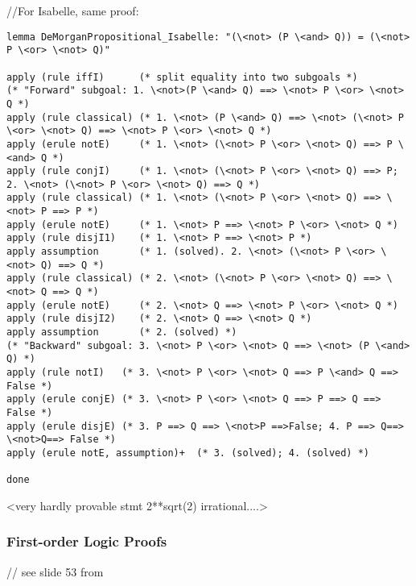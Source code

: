 \documentclass[article]{aaltoseries}
\begin{document}
//For Isabelle, same proof:
\begin{lstlisting}[language=isabelle]
lemma DeMorganPropositional_Isabelle: "(\<not> (P \<and> Q)) = (\<not> P \<or> \<not> Q)"

apply (rule iffI)      (* split equality into two subgoals *)
(* "Forward" subgoal: 1. \<not>(P \<and> Q) ==> \<not> P \<or> \<not> Q *)
apply (rule classical) (* 1. \<not> (P \<and> Q) ==> \<not> (\<not> P \<or> \<not> Q) ==> \<not> P \<or> \<not> Q *)
apply (erule notE)     (* 1. \<not> (\<not> P \<or> \<not> Q) ==> P \<and> Q *)
apply (rule conjI)     (* 1. \<not> (\<not> P \<or> \<not> Q) ==> P; 2. \<not> (\<not> P \<or> \<not> Q) ==> Q *)
apply (rule classical) (* 1. \<not> (\<not> P \<or> \<not> Q) ==> \<not> P ==> P *)
apply (erule notE)     (* 1. \<not> P ==> \<not> P \<or> \<not> Q *)
apply (rule disjI1)    (* 1. \<not> P ==> \<not> P *)
apply assumption       (* 1. (solved). 2. \<not> (\<not> P \<or> \<not> Q) ==> Q *)
apply (rule classical) (* 2. \<not> (\<not> P \<or> \<not> Q) ==> \<not> Q ==> Q *)
apply (erule notE)     (* 2. \<not> Q ==> \<not> P \<or> \<not> Q *)
apply (rule disjI2)    (* 2. \<not> Q ==> \<not> Q *)
apply assumption       (* 2. (solved) *)
(* "Backward" subgoal: 3. \<not> P \<or> \<not> Q ==> \<not> (P \<and> Q) *)
apply (rule notI)   (* 3. \<not> P \<or> \<not> Q ==> P \<and> Q ==> False *)   
apply (erule conjE) (* 3. \<not> P \<or> \<not> Q ==> P ==> Q ==> False *)
apply (erule disjE) (* 3. P ==> Q ==> \<not>P ==>False; 4. P ==> Q==> \<not>Q==> False *)
apply (erule notE, assumption)+  (* 3. (solved); 4. (solved) *)

done
\end{lstlisting}


<very hardly provable stmt 2**sqrt(2) irrational....>



\subsubsection{First-order Logic Proofs}

// see slide 53 from %
\end{document}
